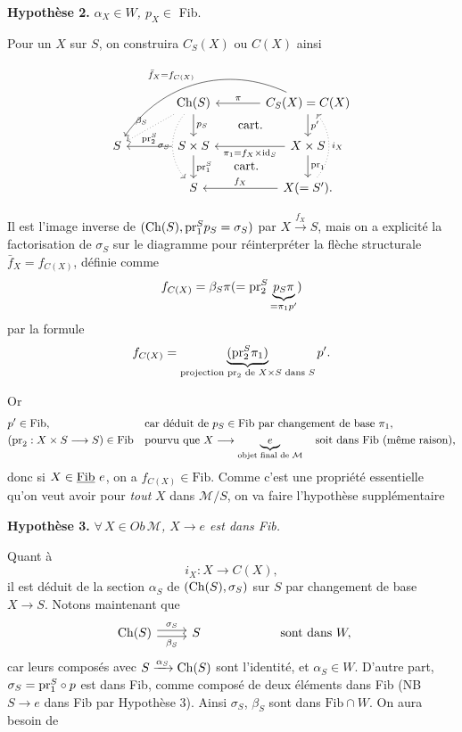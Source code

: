 \textbf{Hypothèse 2.} \textit{$\alpha_X \in W$, $p_X \in$} Fib.

Pour un $X$ sur $S$, on construira $C_S(X)$ ou $C(X)$ ainsi


\[
\begin{tikzcd}[column sep=large]
 & \Ch(S) \arrow[d, "p_S"] \arrow[dl, dotted, "\beta_S"'] \arrow[dd, dotted, bend right=40, "\sigma_S"'] \arrow[dr, phantom, "\text{cart.}"]
 & C_S(X)=C(X) \arrow[l, "\pi"'] \arrow[d, "p'"] \arrow[dll, bend right=40, "\bar f_X=f_{C(X)}"'] \\
S & S\times S \arrow[l, "\pr_2^S"'] \arrow[d, "\pr_1^S"] \arrow[dr, phantom, "\text{cart.}"]
 & X\times S \arrow[l, "\pi_1=f_X\times\mathrm{id}_S"] \arrow[d, "\pr_1"] \\
 & S & X(=S'). \arrow[l, "f_X"'] \arrow[uu, dotted, bend right=40, "i_X"']
\end{tikzcd}
\]

Il est l'image inverse de $(\mathrm{Ch}(S),\mathrm{pr}_1^Sp_S=\sigma_S)$ par $X\xrightarrow{f_X}S$, mais on a explicité la factorisation de $\sigma_S$ sur le diagramme pour réinterpréter la flèche structurale $\bar f_X=f_{C(X)}$, définie comme
\[
f_{C(X)}=\beta_S\pi(=\mathrm{pr}_2^S\underbrace{p_S\pi}_{=\pi_1p'})
\]
par la formule
\[
f_{C(X)}=\underbrace{(\mathrm{pr}_2^S\pi_1)}_{\text{projection } \mathrm{pr}_2 \text{ de } X\times S \text{ dans } S}p'.
\]

Or
\[
\begin{aligned}
&p'\in\mathrm{Fib}, && \text{car déduit de } p_S\in\mathrm{Fib} \text{ par changement de base } \pi_1,\\
&(\mathrm{pr}_2 : X\times S\longrightarrow S)\in\mathrm{Fib} && \text{pourvu que } X\longrightarrow\underbrace{e}_{\text{objet final de } \mathcal{M}}\quad \text{soit dans Fib (même raison),}
\end{aligned}
\]
donc si $X\in\underline{\mathrm{Fib}}\,\,e$, on a $f_{C(X)}\in\mathrm{Fib}$. Comme c'est une propriété essentielle qu'on veut avoir pour \textit{tout} $X$ dans $\mathcal{M}/S$, on va faire l'hypothèse supplémentaire

\textbf{Hypothèse 3.} \textit{$\forall\,X\in\mathit{Ob}\,\mathcal{M}$, $X\longrightarrow e$ est dans Fib.}

Quant à
\[
i_X : X\longrightarrow C(X),
\]
il est déduit de la section $\alpha_S$ de $(\mathrm{Ch}(S),\sigma_S)$ sur $S$ par changement de base $X\longrightarrow S$. Notons maintenant que
\[
\begin{tikzcd}
\Ch(S) \arrow[r, shift left, "\sigma_S"] \arrow[r, shift right, "\beta_S"'] & S
\end{tikzcd}
\qquad\qquad\qquad \text{sont dans } W,
\]
car leurs composés avec $S\xrightarrow{\alpha_S}\mathrm{Ch}(S)$ sont l'identité, et $\alpha_S\in W$. D'autre part, $\sigma_S=\mathrm{pr}_1^S\circ p$ est dans Fib, comme composé de deux éléments dans Fib (NB $S\longrightarrow e$ dans Fib par Hypothèse 3). Ainsi $\sigma_S$, $\beta_S$ sont dans $\mathrm{Fib}\cap W$. On aura besoin de %

